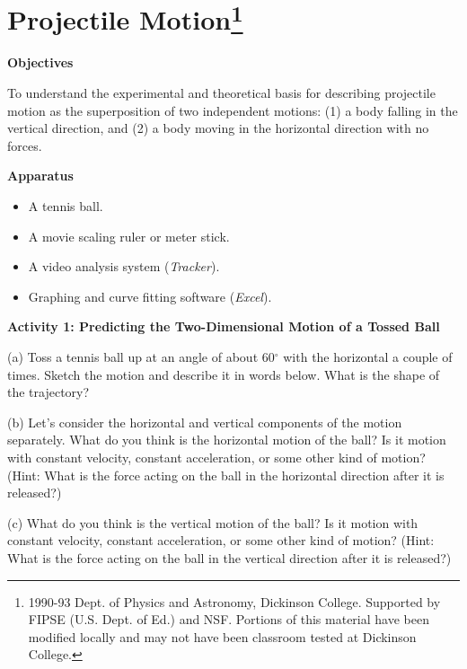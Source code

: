 
\section{Projectile Motion\footnote{
1990-93 Dept. of Physics and Astronomy, Dickinson College. Supported by FIPSE
(U.S. Dept. of Ed.) and NSF. Portions of this material have been modified locally
and may not have been classroom tested at Dickinson College.
}}

\makelabheader %

\textbf{Objectives }

To understand the experimental and theoretical basis for describing projectile
motion as the superposition of two independent motions: (1) a body falling in
the vertical direction, and (2) a body moving in the horizontal direction with
no forces.

\textbf{Apparatus}

\begin{itemize}
\item A tennis ball. 
\item A movie scaling ruler or meter stick.
\item A video analysis system (\textit{Tracker}). 
\item Graphing and curve fitting software (\textit{Excel}).
\end{itemize}
\textbf{Activity 1: Predicting the Two-Dimensional Motion of a Tossed Ball }

(a) Toss a tennis ball up at an angle of about 60\( ^{\circ } \) with the horizontal
a couple of times. Sketch the motion and describe it in words below. What is
the shape of the trajectory?
\vspace{20mm}

(b) Let's consider the horizontal and vertical components of the motion separately.
What do you think is the horizontal motion of the ball? Is it motion with constant
velocity, constant acceleration, or some other kind of motion? (Hint: What
is the force acting on the ball in the horizontal direction after it is released?)
\vspace{20mm}

(c) What do you think is the vertical motion of the ball? Is it motion with
constant velocity, constant acceleration, or some other kind of motion?
(Hint: What is the force acting on the ball in the vertical direction after
it is released?)
\vspace{20mm}

